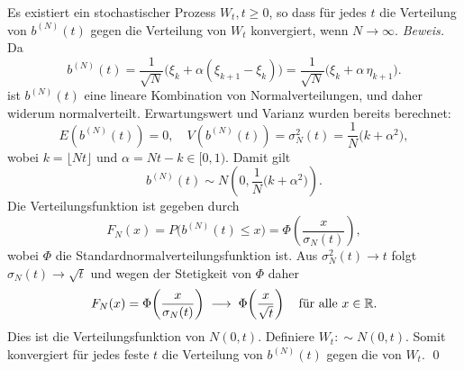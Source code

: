 \begin{lemma}
Es existiert ein stochastischer Prozess $W_t, t \geq 0$, so dass für jedes $t$ die Verteilung von $b^{(N)}(t)$ gegen die Verteilung von $W_t$ konvergiert, wenn $N \to \infty$.
\textit{Beweis.}
Da 
$$b^{(N)}(t) = \frac{1}{\sqrt{N}}\big(\xi_k+\alpha(\xi_{k+1}-\xi_k)\big)
=\frac{1}{\sqrt{N}}\big(\xi_k+\alpha\,\eta_{k+1}\big).
$$
ist $b^{(N)}(t)$ eine lineare Kombination von Normalverteilungen, und daher widerum 
normalverteilt. Erwartungswert und Varianz wurden bereits berechnet:
$$
E(b^{(N)}(t)) = 0, \quad V(b^{(N)}(t)) = \sigma_N^2(t) = \frac{1}{N}\big(k+\alpha^2\big),
$$
wobei $k=\lfloor Nt \rfloor$ und $\alpha=Nt-k\in[0,1)$. Damit gilt
$$
b^{(N)}(t) \sim N\left(0,\frac{1}{N}\big(k+\alpha^2\big)\right).
$$
Die Verteilungsfunktion ist gegeben durch
$$
F_N(x)=P\big(b^{(N)}(t)\le x\big)=\Phi\!\left(\frac{x}{\sigma_N(t)}\right),
$$
wobei $\Phi$ die Standardnormalverteilungsfunktion ist. Aus $\sigma_N^2(t)\to t$ folgt $\sigma_N(t)\to \sqrt{t}$ und wegen der Stetigkeit von $\Phi$ daher
$$
F_N(x)=\Phi\!\left(\frac{x}{\sigma_N(t)}\right)\;\longrightarrow\;\Phi\!\left(\frac{x}{\sqrt{t}}\right)\quad\text{für alle }x\in\Bbb R.
$$
Dies ist die Verteilungsfunktion von $N(0,t)$. Definiere $W_t :\sim N(0,t)$. Somit konvergiert für jedes feste $t$ die Verteilung von $b^{(N)}(t)$ gegen die von $W_t$. 
\qed
\end{lemma}

